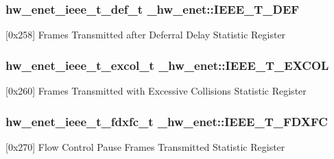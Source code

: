 \subsubsection[{\texorpdfstring{I\+E\+E\+E\+\_\+\+T\+\_\+\+D\+EF}{IEEE_T_DEF}}]{ {\bf hw\+\_\+enet\+\_\+ieee\+\_\+t\+\_\+def\+\_\+t} \+\_\+hw\+\_\+enet\+::\+I\+E\+E\+E\+\_\+\+T\+\_\+\+D\+EF}\hypertarget{struct__hw__enet_aff13d9609434a0c2dff18b3489831367}{}\label{struct__hw__enet_aff13d9609434a0c2dff18b3489831367}
\mbox{[}0x258\mbox{]} Frames Transmitted after Deferral Delay Statistic Register 
\subsubsection[{\texorpdfstring{I\+E\+E\+E\+\_\+\+T\+\_\+\+E\+X\+C\+OL}{IEEE_T_EXCOL}}]{ {\bf hw\+\_\+enet\+\_\+ieee\+\_\+t\+\_\+excol\+\_\+t} \+\_\+hw\+\_\+enet\+::\+I\+E\+E\+E\+\_\+\+T\+\_\+\+E\+X\+C\+OL}\hypertarget{struct__hw__enet_ab232f28f6ec54cd2e459d262b1b9134a}{}\label{struct__hw__enet_ab232f28f6ec54cd2e459d262b1b9134a}
\mbox{[}0x260\mbox{]} Frames Transmitted with Excessive Collisions Statistic Register 
\subsubsection[{\texorpdfstring{I\+E\+E\+E\+\_\+\+T\+\_\+\+F\+D\+X\+FC}{IEEE_T_FDXFC}}]{ {\bf hw\+\_\+enet\+\_\+ieee\+\_\+t\+\_\+fdxfc\+\_\+t} \+\_\+hw\+\_\+enet\+::\+I\+E\+E\+E\+\_\+\+T\+\_\+\+F\+D\+X\+FC}\hypertarget{struct__hw__enet_aef8c5cd00a7804762704b9fb135f5e46}{}\label{struct__hw__enet_aef8c5cd00a7804762704b9fb135f5e46}
\mbox{[}0x270\mbox{]} Flow Control Pause Frames Transmitted Statistic Register 
